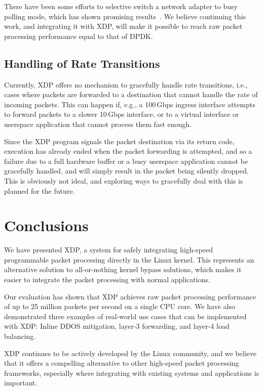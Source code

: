 \documentclass[10pt,sigconf]{acmart}
\begin{document}
There have been some efforts to selective switch a network adapter to busy
polling mode, which has shown promising results~\cite{dumazet17:_busyp}. We
believe continuing this work, and integrating it with XDP, will make it possible
to reach raw packet processing performance equal to that of DPDK.

\subsection{Handling of Rate Transitions}
\label{sec:handl-rate-trans}
Currently, XDP offers no mechanism to gracefully handle rate transitions, i.e.,
cases where packets are forwarded to a destination that cannot handle the rate
of incoming packets. This can happen if, e.g., a 100\,Gbps ingress interface
attempts to forward packets to a slower 10\,Gbps interface, or to a virtual
interface or userspace application that cannot process them fast enough.

Since the XDP program signals the packet destination via its return code,
execution has already ended when the packet forwarding is attempted, and so a
failure due to a full hardware buffer or a busy userspace application cannot be
gracefully handled, and will simply result in the packet being silently dropped.
This is obviously not ideal, and exploring ways to gracefully deal with this is
planned for the future.


\section{Conclusions}
\label{sec:conclusion}
We have presented XDP, a system for safely integrating high-speed programmable
packet processing directly in the Linux kernel. This represents an alternative
solution to all-or-nothing kernel bypass solutions, which makes it easier to
integrate the packet processing with normal applications.

Our evaluation has shown that XDP achieves raw packet processing performance of
up to 25 million packets per second on a single CPU core. We have also
demonstrated three examples of real-world use cases that can be implemented with
XDP: Inline DDOS mitigation, layer-3 forwarding, and layer-4 load balancing.

XDP continues to be actively developed by the Linux community, and we believe
that it offers a compelling alternative to other high-speed packet processing
frameworks, especially where integrating with existing systems and applications
is important.



\end{document}
